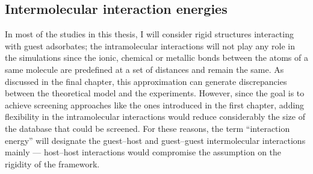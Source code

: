 \documentclass[main.tex]{subfiles}
\begin{document}
\subsection{Intermolecular interaction energies}\label{sct:interaction}

In most of the studies in this thesis, I will consider rigid structures interacting with guest adsorbates; the intramolecular interactions will not play any role in the simulations since the ionic, chemical or metallic  bonds between the atoms of a same molecule are predefined at a set of distances and remain the same. As discussed in the final chapter, this approximation can generate discrepancies between the theoretical model and the experiments. However, since the goal is to achieve screening approaches like the ones introduced in the first chapter, adding flexibility in the intramolecular interactions would reduce considerably the size of the database that could be screened. For these reasons, the term ``interaction energy'' will designate the guest--host and guest--guest intermolecular interactions mainly --- host--host interactions would compromise the assumption on the rigidity of the framework.
\end{document}

